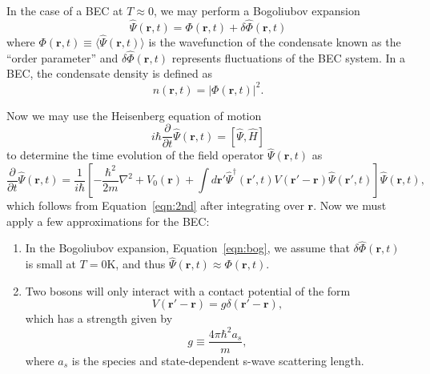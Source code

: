 In the case of a BEC at $T\approx0$, we may perform a Bogoliubov expansion~\cite{Bogoliubov1947, Dalfovo1999}
\begin{equation}
    \hat \Psi (\mathbf{r}, t) = \Phi(\mathbf{r},t) + \delta \hat \Phi(\mathbf{r},t)
\label{eqn:bog}
\end{equation}
where $\Phi(\mathbf{r},t) \equiv \langle \hat \Psi(\mathbf{r},t) \rangle$ is the wavefunction of the condensate known as the ``order parameter'' and $\delta \hat \Phi(\mathbf{r},t)$ represents fluctuations of the BEC system.
In a BEC, the condensate density is defined as
\begin{equation}
    n(\mathbf{r},t) = |\Phi(\mathbf{r},t)|^2.
\end{equation}

Now we may use the Heisenberg equation of motion
\begin{equation}
    i\hbar \frac{\partial}{\partial t}\hat \Psi(\mathbf{r},t) = [\hat \Psi, \hat H]
\end{equation}
    to determine the time evolution of the field operator $\hat \Psi(\mathbf{r},t)$ as
\begin{equation}
    \frac{\partial}{\partial t}\hat \Psi(\mathbf{r},t) = \frac{1}{i\hbar}\left[-\frac{\hbar^2}{2m}\nabla^2 + V_0(\mathbf{r}) + \int d\mathbf{r'} \hat \Psi^\dagger(\mathbf{r'}, t)V(\mathbf{r'} -\mathbf{r})\hat \Psi(\mathbf{r'},t)\right]\hat \Psi(\mathbf{r},t),
\end{equation}
which follows from Equation~\eqref{eqn:2nd} after integrating over $\mathbf{r}$. 
Now we must apply a few approximations for the BEC:
\begin{enumerate}
    \item In the Bogoliubov expansion, Equation~\eqref{eqn:bog}, we assume that $\delta \hat \Phi(\mathbf{r},t)$ is small at $T = 0\text{K}$, and thus $\hat \Psi(\mathbf{r},t) \approx \Phi(\mathbf{r},t)$. 
    \item Two bosons will only interact with a contact potential of the form
    \begin{equation}
        V(\mathbf{r'}-\mathbf{r}) = g\delta(\mathbf{r'} - \mathbf{r}),
    \end{equation}
    which has a strength given by
    \begin{equation}
        g \equiv \frac{4 \pi \hbar^2 a_s}{m},
    \end{equation}
    where $a_s$ is the species and state-dependent s-wave scattering length.
\end{enumerate}

